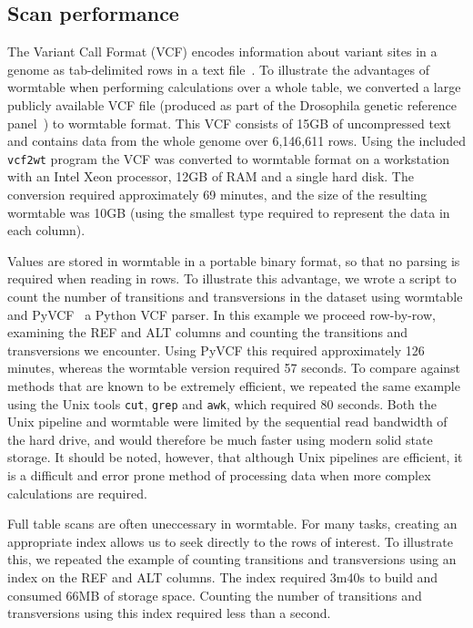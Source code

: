 \documentclass[10pt]{bmc_article}
\newenvironment{bmcformat}{\begin{raggedright}\baselineskip20pt\sloppy\setboolean{publ}{false}}{\end{raggedright}\baselineskip20pt\sloppy}
\begin{document}
\begin{bmcformat}
\subsection*{Scan performance}
The Variant Call Format (VCF) encodes information about variant sites in a genome 
as tab-delimited rows in a text file~\cite{da+11}.  
To illustrate the advantages of wormtable when performing calculations over 
a whole table, we converted a large 
publicly available VCF file (produced as part of the
Drosophila genetic reference panel~\cite{mr+12}) to wormtable format.
This VCF\cite{freeze.vcf}
consists of 15GB of uncompressed text and contains data from the 
whole genome over 6,146,611 rows.
Using the included \texttt{vcf2wt} program
the VCF was converted to wormtable format 
on a workstation with an Intel Xeon processor, 12GB of RAM 
and a single hard disk. The
conversion required approximately 69 minutes, and the size of the resulting  
wormtable was 10GB (using the smallest type required
to represent the data in each column).

Values are stored in wormtable in a portable binary format, so that no parsing is
required when reading in rows. To illustrate this advantage, we
wrote a script to count the number of transitions and transversions
in the dataset using wormtable and PyVCF~\cite{pyvcf}
a Python VCF parser.  In this example we proceed 
row-by-row, examining the REF and ALT columns and
counting the transitions and transversions we encounter. 
Using PyVCF this required approximately 126 minutes, whereas 
the wormtable version required
57 seconds. To compare against methods that are known to be extremely
efficient, we repeated the same 
example using the Unix tools \texttt{cut}, \texttt{grep} 
and \texttt{awk},  which required 80 seconds. Both the
Unix pipeline and wormtable were limited by the sequential read
bandwidth of the hard drive, and would therefore be much 
faster using modern solid state storage.
It should be noted, however, that although Unix 
pipelines are efficient, it is a difficult and error prone method 
of processing data when more complex calculations are required.

Full table scans are often uneccessary in wormtable. For many tasks,
creating an appropriate index allows us to seek directly to the 
rows of interest. To illustrate this, we repeated the example 
of counting transitions and transversions using an index 
on the REF and ALT columns.
The index required 3m40s to build and 
consumed 66MB of storage space. Counting the number of 
transitions and transversions using this index required 
less than a second.


\end{bmcformat}
\end{document}
